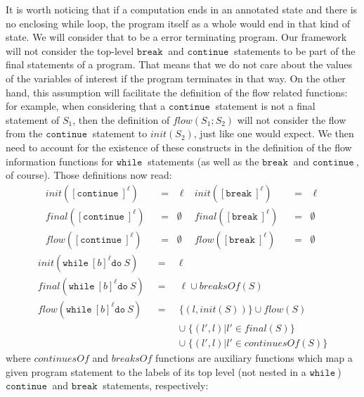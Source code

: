 \documentclass[a4wide,12pt]{article}
\def\eq{\;\; = \;\;}
\def\while{\texttt{while}\ }
\def\do {\texttt{do}\ }
\def\cont {\texttt{continue}\ }
\def\breakc{\texttt{break}\ }
\begin{document}
It is worth noticing that if a computation ends in an annotated state and there is
no enclosing while loop, the program itself as a whole would end in that kind of state.
We will consider that to be a error terminating program. Our framework will not consider
the top-level $\breakc$ and $\cont$ statements to be part of the final statements of
a program. That means that we do not care about the values of the variables of interest
if the program terminates in that way. 
On the other hand, this assumption will facilitate the definition of
the flow related functions: for example, when considering that a $\cont$ statement is not
a final statement of $S_1$, then the definition of $flow(S_1;S_2)$ will not consider the flow
from the $\cont$ statement to $init(S_2)$, just like one would expect. We then need to account
for the existence of these constructs in the definition of the flow information functions
for $\while$ statements (as well as the $\breakc$ and $\cont$, of course).
Those definitions now read:
\begin{align*}
init ([\cont]^\ell) &\eq \ell & init ([\breakc]^\ell) &\eq \ell \\
final([\cont]^\ell) &\eq \emptyset & final([\breakc]^\ell) &\eq \emptyset \\
flow ([\cont]^\ell) &\eq \emptyset & flow ([\breakc]^\ell) &\eq \emptyset
\end{align*}
\begin{eqnarray*}
init (\while [b]^\ell \do S) &\eq& \ell \\
final(\while [b]^\ell \do S) &\eq& \ell \cup breaksOf(S) \\
flow (\while [b]^\ell \do S) &\eq& \{(l,init(S))\} \cup flow(S) \\
                            & & \cup\; \{(l',l) | l' \in final(S)\} \\
                            & & \cup\; \{(l',l) | l' \in continuesOf(S)\}
\end{eqnarray*}
where $continuesOf$ and $breaksOf$ functions are auxiliary functions which map a given program statement
to the labels of its top level (not nested in a $\while$) $\cont$ and $\breakc$ statements, respectively:
 
\end{document}

